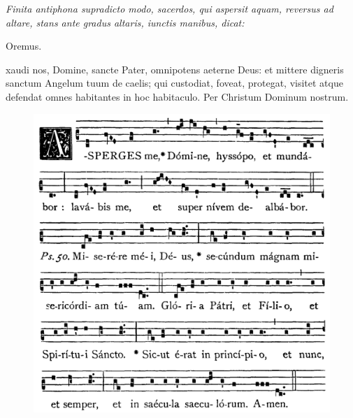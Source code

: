 \divisio


\textit{%
    Finita antiphona supradicto modo, sacerdos, qui aspersit aquam, reversus ad
    altare, stans ante gradus altaris, iunctis manibus, dicat:
}

{\setlength{\parskip}{0pt}
\par{}
\par{}
\par{}
\par{}
\par{}}

Oremus.

xaudi nos, Domine, sancte Pater, omnipotens aeterne Deus: et
mittere digneris sanctum Angelum tuum de caelis; qui custodiat, foveat,
protegat, visitet atque defendat omnes habitantes in hoc habitaculo.  Per
Christum Dominum nostrum.


\vfill
\begin{figure}[h]
    \includegraphics[width=\textwidth]{img/asperges.png}
\end{figure}
\vfill
